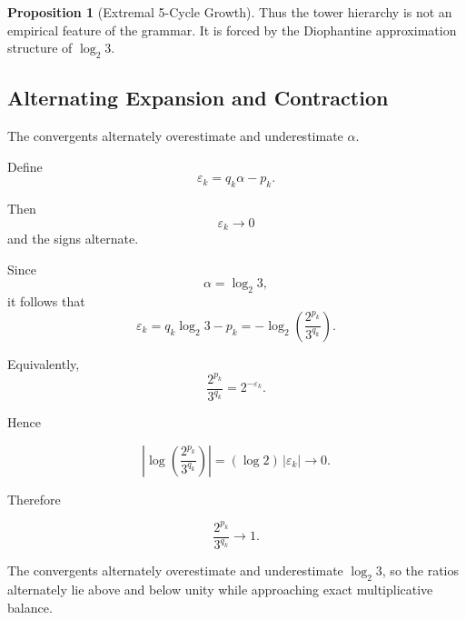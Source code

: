 \documentclass[12pt, oneside]{article}
\numberwithin{equation}{section}
\theoremstyle{definition}
\newtheorem{proposition}{Proposition}[section]
\theoremstyle{plain}
\theoremstyle{remark}
\newtheorem*{remark}{Remark}
\begin{document}
\begin{proposition}[Extremal 5-Cycle Growth]


Thus the tower hierarchy is not an empirical feature of the grammar.
It is forced by the Diophantine approximation structure of $\log_2 3$.

\subsection{Alternating Expansion and Contraction}

The convergents alternately overestimate and underestimate $\alpha$.

Define
\[
\varepsilon_k = q_k\alpha-p_k.
\]

Then
\[
\varepsilon_k \to 0
\]
and the signs alternate.

Since
\[
\alpha=\log_2 3,
\]
it follows that
\[
\varepsilon_k = q_k\log_2 3-p_k = -\log_2\!\left(\frac{2^{p_k}}{3^{q_k}}\right).
\]

Equivalently,
\[
\frac{2^{p_k}}{3^{q_k}} = 2^{-\varepsilon_k}.
\]

Hence

\[
\left|
\log\!\left(
\frac{2^{p_k}}{3^{q_k}}
\right)
\right|
=
(\log 2)\,|\varepsilon_k|
\to0.
\]

Therefore

\[
\frac{2^{p_k}}{3^{q_k}}
\to1.
\]

The convergents alternately overestimate and underestimate
$\log_2 3$, so the ratios alternately lie above and below unity while
approaching exact multiplicative balance.


\end{proposition}
\end{document}
